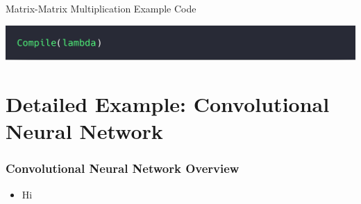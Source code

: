 \documentclass[10pt]{beamer}
\begin{document}
\begin{frame}{Matrix-Matrix Multiplication Example Code}
        \begin{block}{}
        \begin{center}
            \includegraphics[width=.5\textwidth]{../images/simpleCompile.png}
        \end{center}
        \end{block}

\end{frame}

\section{Detailed Example: Convolutional Neural Network }

\begin{frame}
\frametitle{Convolutional Neural Network Overview}
\vspace{.2cm}
\begin{itemize}
    \item Hi
\end{itemize}
\vspace{-1.2cm}
\end{frame}
\end{document}
